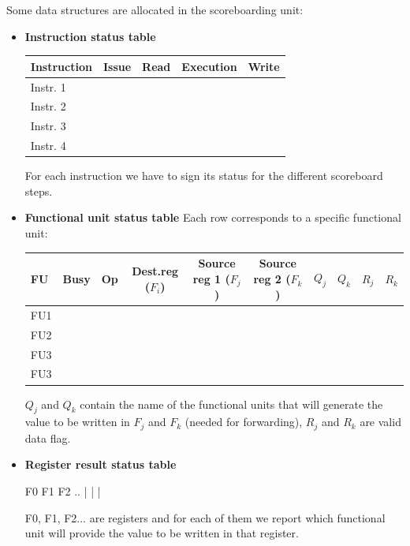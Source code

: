 Some data structures are allocated in the scoreboarding unit:

\begin{itemize}
\item \textbf{Instruction status table}
\begin{center}
  \begin{tabular}{|l|c|c|c|c|}
    \hline
    Instruction&  Issue&    Read&  Execution&   Write\\
    \hline
    Instr. 1  & & & &  \\
    Instr. 2  & & & &  \\
    Instr. 3  & & & &  \\
    Instr. 4  & & & &  \\
    \hline
  \end{tabular}
\end{center}

For each instruction we have to sign its status for the different scoreboard
steps.

\item \textbf{Functional unit status table}
Each row corresponds to a specific functional unit:

\begin{center}
  \begin{tabular}{|l|c|c|c|c|c|c|c|c|c|}
    \hline
    FU &Busy& Op &  Dest.reg ($F_i$)& Source reg 1
    ($F_j$)&
    Source reg 2 ($F_k$)& $Q_j$& $Q_k$& $R_j$&  $R_k$\\
    \hline
    FU1 & & & & & & & & & \\
    FU2 & & & & & & & & & \\
    FU3 & & & & & & & & & \\
    FU3 & & & & & & & & & \\
    \hline
\end{tabular}
\end{center}

$Q_j$ and $Q_k$ contain the name of the functional units that will generate
the value to be written in $F_j$ and $F_k$ (needed for forwarding), $R_j$ and
$R_k$ are valid data flag.

\item \textbf{Register result status table}

F0    F1    F2    ..
| |   |

F0, F1, F2... are registers and for each of them we report which functional
unit will provide the value to be written in that register.
\end{itemize}

